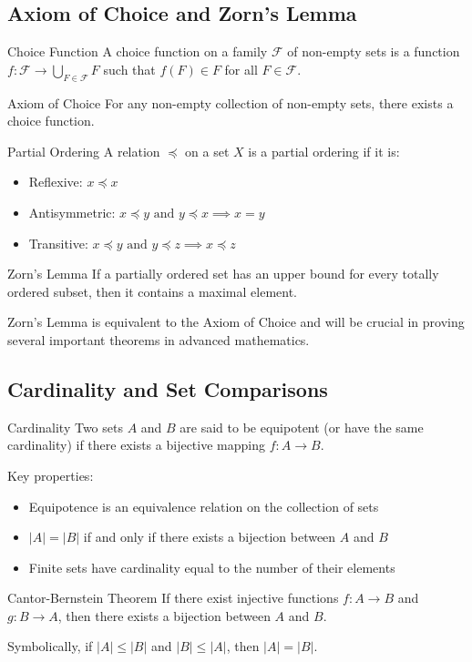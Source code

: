 \subsection{Axiom of Choice and Zorn's Lemma}

\begin{definitionbox}{Choice Function}
A choice function on a family $\mathcal{F}$ of non-empty sets is a function $f: \mathcal{F} \to \bigcup_{F \in \mathcal{F}} F$ such that $f(F) \in F$ for all $F \in \mathcal{F}$.
\end{definitionbox}

\begin{theorembox}{Axiom of Choice}
For any non-empty collection of non-empty sets, there exists a choice function.
\end{theorembox}

\begin{definitionbox}{Partial Ordering}
A relation $\preceq$ on a set $X$ is a partial ordering if it is:
\begin{itemize}
    \item Reflexive: $x \preceq x$
    \item Antisymmetric: $x \preceq y \text{ and } y \preceq x \implies x = y$
    \item Transitive: $x \preceq y \text{ and } y \preceq z \implies x \preceq z$
\end{itemize}
\end{definitionbox}

\begin{theorembox}{Zorn's Lemma}
If a partially ordered set has an upper bound for every totally ordered subset, then it contains a maximal element.
\end{theorembox}

\begin{note}
Zorn's Lemma is equivalent to the Axiom of Choice and will be crucial in proving several important theorems in advanced mathematics.
\end{note}

\subsection{Cardinality and Set Comparisons}

\begin{definitionbox}{Cardinality}
Two sets $A$ and $B$ are said to be equipotent (or have the same cardinality) if there exists a bijective mapping $f: A \to B$. 

Key properties:
\begin{itemize}
    \item Equipotence is an equivalence relation on the collection of sets
    \item $|A| = |B|$ if and only if there exists a bijection between $A$ and $B$
    \item Finite sets have cardinality equal to the number of their elements
\end{itemize}
\end{definitionbox}

\begin{theorembox}{Cantor-Bernstein Theorem}
If there exist injective functions $f: A \to B$ and $g: B \to A$, then there exists a bijection between $A$ and $B$. 

Symbolically, if $|A| \leq |B|$ and $|B| \leq |A|$, then $|A| = |B|$.
\end{theorembox}
